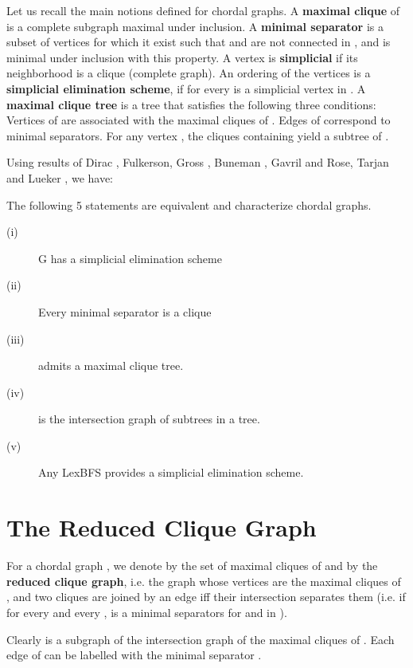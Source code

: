 \documentclass{endm}
\begin{document}
Let us recall the main notions defined for chordal graphs. A \textbf{maximal clique} of  is a complete subgraph maximal under inclusion.
A \textbf{minimal separator} is  a subset of vertices  
for which  it exist  such that  and  are not connected in ,
and  is minimal under inclusion with this property.
A vertex is \textbf{simplicial} if its neighborhood is a clique (complete graph).
An ordering  of the vertices is a \textbf{simplicial elimination scheme}, if for every 
 is a simplicial vertex in .
A \textbf{maximal clique tree}   is a tree  that satisfies
the following three conditions:
Vertices of  are associated with the maximal cliques of .
Edges of  correspond to minimal separators.
For any vertex , the cliques containing  yield a subtree of .



Using results of Dirac \cite{D61}, Fulkerson, Gross \cite{FG65}, Buneman \cite{B74}, Gavril \cite{G74} and Rose, Tarjan and Lueker \cite{RTL76},
we have:
\begin{theorem} The following  5 statements are equivalent and characterize chordal graphs. 
\begin{description}
\item[(i)]
G  has a simplicial elimination scheme
\item[(ii)]
Every minimal separator is a clique
\item[(iii)]
 admits a maximal clique tree.
\item[(iv)]  is the intersection graph of subtrees in a tree.
\item[(v)]
Any LexBFS provides a simplicial elimination scheme.
\end{description}

\end{theorem}
\section{The Reduced Clique Graph}
\begin{definition}
For a chordal graph , we denote by  the set of maximal cliques of   and by  the  \textbf{reduced clique graph}, i.e. the graph whose vertices are the maximal cliques of , and two cliques are joined by an edge iff their intersection  separates them (i.e.  if  for every  and every ,  is a minimal separators for  and  in ). \end{definition}
Clearly  is a subgraph of the intersection graph of the maximal cliques of .
Each edge   of  can be  labelled with the minimal separator . 
\end{document}
